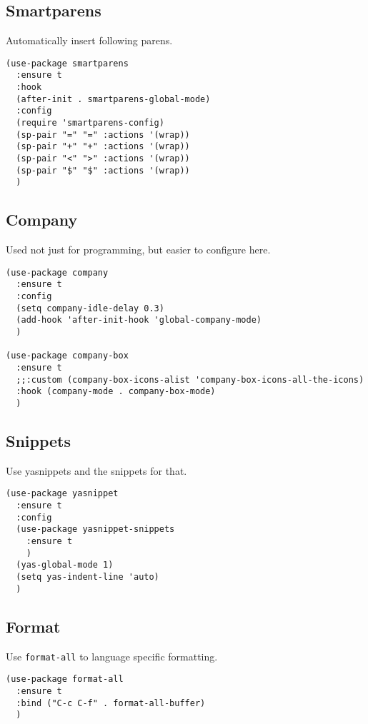 \documentclass[11pt]{article}
\begin{document}
\subsection{Smartparens}
\label{sec:orgecf2596}
Automatically insert following parens.
\begin{verbatim}
(use-package smartparens
  :ensure t
  :hook
  (after-init . smartparens-global-mode)
  :config
  (require 'smartparens-config)
  (sp-pair "=" "=" :actions '(wrap))
  (sp-pair "+" "+" :actions '(wrap))
  (sp-pair "<" ">" :actions '(wrap))
  (sp-pair "$" "$" :actions '(wrap))
  )

\end{verbatim}
\subsection{Company}
\label{sec:orgf389d78}
Used not just for programming, but easier to configure here.
\begin{verbatim}
(use-package company
  :ensure t
  :config
  (setq company-idle-delay 0.3)
  (add-hook 'after-init-hook 'global-company-mode)
  )

(use-package company-box
  :ensure t
  ;;:custom (company-box-icons-alist 'company-box-icons-all-the-icons)
  :hook (company-mode . company-box-mode)
  )
\end{verbatim}
\subsection{Snippets}
\label{sec:org25a82b9}
Use yasnippets and the snippets for that.
\begin{verbatim}
(use-package yasnippet
  :ensure t
  :config
  (use-package yasnippet-snippets
    :ensure t
    )
  (yas-global-mode 1)
  (setq yas-indent-line 'auto)
  )
\end{verbatim}
\subsection{Format}
\label{sec:orgbeca854}
Use \texttt{format-all} to language specific formatting.
\begin{verbatim}
(use-package format-all
  :ensure t
  :bind ("C-c C-f" . format-all-buffer)
  )
\end{verbatim}
\end{document}
